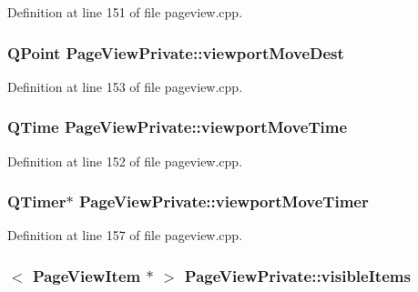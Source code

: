 Definition at line 151 of file pageview.\+cpp.

\hypertarget{classPageViewPrivate_ae9cc8ec67277ed3904a0cad6108d2a7a}{
\subsubsection[{viewport\+Move\+Dest}]{\setlength{\rightskip}{0pt plus 5cm}Q\+Point Page\+View\+Private\+::viewport\+Move\+Dest}}\label{classPageViewPrivate_ae9cc8ec67277ed3904a0cad6108d2a7a}


Definition at line 153 of file pageview.\+cpp.

\hypertarget{classPageViewPrivate_a90cdedb649dd9a15775a0157c0bc76da}{
\subsubsection[{viewport\+Move\+Time}]{\setlength{\rightskip}{0pt plus 5cm}Q\+Time Page\+View\+Private\+::viewport\+Move\+Time}}\label{classPageViewPrivate_a90cdedb649dd9a15775a0157c0bc76da}


Definition at line 152 of file pageview.\+cpp.

\hypertarget{classPageViewPrivate_aa64146b7eacddc342bbdded26dc08c6a}{
\subsubsection[{viewport\+Move\+Timer}]{\setlength{\rightskip}{0pt plus 5cm}Q\+Timer$\ast$ Page\+View\+Private\+::viewport\+Move\+Timer}}\label{classPageViewPrivate_aa64146b7eacddc342bbdded26dc08c6a}


Definition at line 157 of file pageview.\+cpp.

\hypertarget{classPageViewPrivate_a918fbcda86c5b2b449c97e818ab5d5f9}{
\subsubsection[{visible\+Items}]{$<$ {\bf Page\+View\+Item} $\ast$ $>$ Page\+View\+Private\+::visible\+Items}}\label{classPageViewPrivate_a918fbcda86c5b2b449c97e818ab5d5f9}


